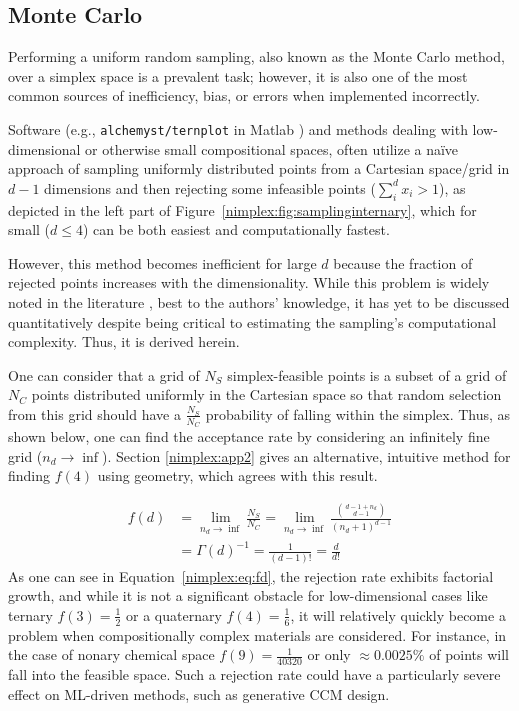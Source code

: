 \subsection{Monte Carlo} \label{nimplex:ssec:mc}

Performing a uniform random sampling, also known as the Monte Carlo method, over a simplex space is a prevalent task; however, it is also one of the most common sources of inefficiency, bias, or errors when implemented incorrectly.

Software (e.g., \texttt{alchemyst/ternplot} in Matlab \cite{Sandrock2017Alchemyst/ternplothttps://github.com/alchemyst/ternplot}) and methods dealing with low-dimensional or otherwise small compositional spaces, often utilize a na\"ive approach of sampling uniformly distributed points from a Cartesian space/grid in $d-1$ dimensions and then rejecting some infeasible points ($\sum^d_i x_i > 1$), as depicted in the left part of Figure~\ref{nimplex:fig:samplinginternary}, which for small ($d \leq 4$) can be both easiest and computationally fastest. 

However, this method becomes inefficient for large $d$ because the fraction of rejected points increases with the dimensionality. While this problem is widely noted in the literature \cite{Allen2022AAlloys}, best to the authors' knowledge, it has yet to be discussed quantitatively despite being critical to estimating the sampling's computational complexity. Thus, it is derived herein.

One can consider that a grid of $N_S$ simplex-feasible points is a subset of a grid of $N_C$ points distributed uniformly in the Cartesian space so that random selection from this grid should have a $\frac{N_S}{N_C}$ probability of falling within the simplex. Thus, as shown below, one can find the acceptance rate by considering an infinitely fine grid ($n_d\rightarrow\inf$). Section \ref{nimplex:app2} gives an alternative, intuitive method for finding $f(4)$ using geometry, which agrees with this result.

\begin{equation}
    \begin{aligned}
        f(d) &= \lim_{n_d\rightarrow\inf} \frac{N_S}{N_C} = \lim_{n_d\rightarrow\inf} \frac{\binom{d-1+n_d}{d-1}}{(n_d+1)^{d-1}}\\
        &= \Gamma(d)^{-1} = \frac{1}{(d-1)!} = \frac{d}{d!}
    \end{aligned}
    \label{nimplex:eq:fd}
\end{equation}
As one can see in Equation~\ref{nimplex:eq:fd}, the rejection rate exhibits factorial growth, and while it is not a significant obstacle for low-dimensional cases like ternary $f(3)=\frac{1}{2}$ or a quaternary $f(4) = \frac{1}{6}$, it will relatively quickly become a problem when compositionally complex materials are considered. For instance, in the case of nonary chemical space $f(9) = \frac{1}{40320}$ or only $\approx0.0025\%$ of points will fall into the feasible space. Such a rejection rate could have a particularly severe effect on ML-driven methods, such as generative CCM design.

